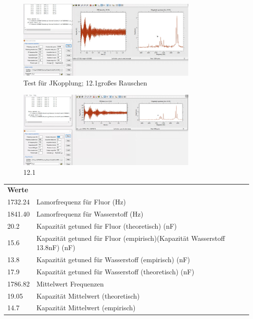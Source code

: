     \vspace{1cm}


    \begin{figure}[H]
        \centering
        \includegraphics[width=0.8\textwidth]{Screenshot2/12_1rauschen.jpg}
        \caption{Test für JKopplung; 12.1großes Rauschen}
    \end{figure}

    \begin{figure}[H]
        \centering
        \includegraphics[width=0.8\textwidth]{Screenshot2/12_1.jpg}
        \caption{12.1}
    \end{figure}


\begin{tabular}{ll}

    \textbf{Werte}&            \\
    
       1732.24 & Lamorfrequenz für Fluor (Hz) \\
    
       1841.40 & Lamorfrequenz für Wasserstoff (Hz) \\
    
          20.2 & Kapazität getuned für Fluor (theoretisch) (nF) \\
    
          15.6 & Kapazität getuned für Fluor (empirisch)(Kapazität Wasserstoff 13.8nF) (nF) \\
    
          13.8 & Kapazität getuned für Wasserstoff (empirisch) (nF) \\
    
          17.9 & Kapazität getuned für Wasserstoff (theoretisch) (nF) \\
    
       1786.82 & Mittelwert Frequenzen \\
    
         19.05 & Kapazität Mittelwert (theoretisch) \\
    
          14.7 & Kapazität Mittelwert (empirisch) \\
    
    \end{tabular}  


